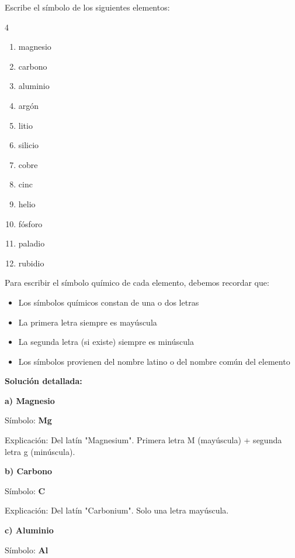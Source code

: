 \begin{exercise}
    Escribe el símbolo de los siguientes elementos:
    \begin{multicols}{4}
        \begin{enumerate}[label=\letraminuscula]
        \item magnesio
        \item carbono
        \item aluminio
        \item argón
        \item litio
        \item silicio
        \item cobre
        \item cinc
        \item helio
        \item fósforo
        \item paladio
        \item rubidio
        \end{enumerate}
    \end{multicols}
    \begin{solu}
        Para escribir el símbolo químico de cada elemento, debemos recordar que:
        \begin{itemize}
            \item Los símbolos químicos constan de una o dos letras
            \item La primera letra siempre es mayúscula
            \item La segunda letra (si existe) siempre es minúscula
            \item Los símbolos provienen del nombre latino o del nombre común del elemento
        \end{itemize}

        \textbf{Solución detallada:}

        \textbf{a) Magnesio}

        Símbolo: \textbf{Mg}

        Explicación: Del latín "Magnesium". Primera letra M (mayúscula) + segunda letra g (minúscula).

        \textbf{b) Carbono}

        Símbolo: \textbf{C}

        Explicación: Del latín "Carbonium". Solo una letra mayúscula.

        \textbf{c) Aluminio}

        Símbolo: \textbf{Al}


\end{solu}
\end{exercise}
